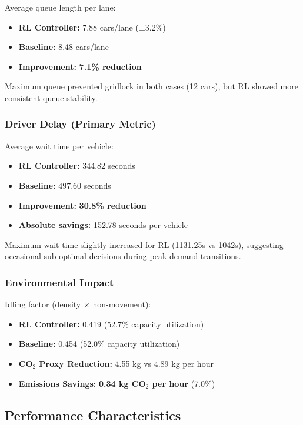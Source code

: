 \documentclass[10pt,conference]{IEEEtran}
\begin{document}
Average queue length per lane:
\begin{itemize}
    \item \textbf{RL Controller:} 7.88 cars/lane (±3.2\%)
    \item \textbf{Baseline:} 8.48 cars/lane
    \item \textbf{Improvement:} \textbf{7.1\% reduction}
\end{itemize}

Maximum queue prevented gridlock in both cases (12 cars), but RL showed more consistent queue stability.

\subsubsection{Driver Delay (Primary Metric)}

Average wait time per vehicle:
\begin{itemize}
    \item \textbf{RL Controller:} 344.82 seconds
    \item \textbf{Baseline:} 497.60 seconds
    \item \textbf{Improvement:} \textbf{30.8\% reduction}
    \item \textbf{Absolute savings:} 152.78 seconds per vehicle
\end{itemize}

Maximum wait time slightly increased for RL (1131.25s vs 1042s), suggesting occasional sub-optimal decisions during peak demand transitions.

\subsubsection{Environmental Impact}

Idling factor (density × non-movement):
\begin{itemize}
    \item \textbf{RL Controller:} 0.419 (52.7\% capacity utilization)
    \item \textbf{Baseline:} 0.454 (52.0\% capacity utilization)
    \item \textbf{CO$_2$ Proxy Reduction:} 4.55 kg vs 4.89 kg per hour
    \item \textbf{Emissions Savings:} \textbf{0.34 kg CO$_2$ per hour} (7.0\%)
\end{itemize}

\subsection{Performance Characteristics}
\end{document}
